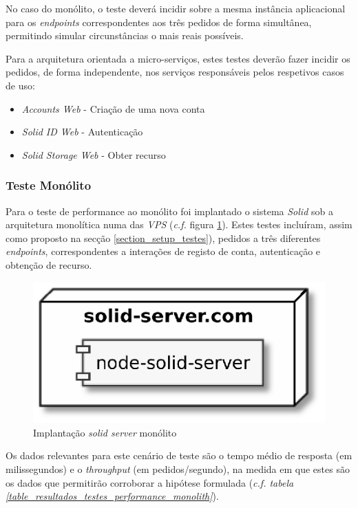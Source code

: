No caso do monólito, o teste deverá incidir sobre a mesma instância aplicacional para os \emph{endpoints} correspondentes aos três pedidos de forma simultânea, permitindo simular circunstâncias o mais reais possíveis.

Para a arquitetura orientada a micro-serviços, estes testes deverão fazer incidir os pedidos, de forma independente, nos serviços responsáveis pelos respetivos casos de uso:
\begin{itemize}
    \item \emph{Accounts Web} - Criação de uma nova conta
    \item \emph{Solid ID Web} - Autenticação
    \item \emph{Solid Storage Web} - Obter recurso
\end{itemize}

\subsubsection{Teste Monólito \label{section_tests_monolith}}

Para o teste de performance ao monólito foi implantado o sistema \emph{Solid} sob a arquitetura monolítica numa das \emph{VPS} (\emph{c.f.} figura \ref{monolith_tests_implantation_diagram}). Estes testes incluíram, assim como proposto na secção \ref{section_setup_testes}), pedidos a três diferentes \emph{endpoints}, correspondentes a interações de registo de conta, autenticação e obtenção de recurso.

\begin{figure}[H]
    \begin{center}
    \includegraphics[width=0.3 \textwidth]{figures/monolith_tests.eps}
    \caption{Implantação \emph{solid server} monólito}
    \label{monolith_tests_implantation_diagram}
    \end{center}
\end{figure}

Os dados relevantes para este cenário de teste são o tempo médio de resposta (em milissegundos) e o \emph{throughput} (em pedidos/segundo), na medida em que estes são os dados que permitirão corroborar a hipótese formulada (\emph{c.f. tabela \ref{table_resultados_testes_performance_monolith}}).

